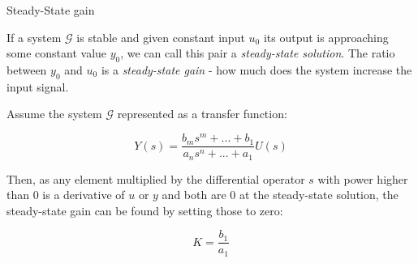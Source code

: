\documentclass{beamer}
\begin{document}
%		
%		
%		
%		
%		




\begin{frame}{Steady-State gain}
	\begin{flushleft}
		
		If a system  $\mathcal{G}$ is stable and given constant input $u_0$ its output is approaching some constant value $y_0$, we can call this pair a \emph{steady-state solution}. The ratio between $y_0$ and $u_0$ is a \emph{steady-state gain} - how much does the system increase the input signal.
		
		Assume the system  $\mathcal{G}$ represented as a transfer function:
		
		\begin{equation}
			Y(s) = \frac{b_m s^m + ... + b_1}{a_n s^n + ... + a_1} U(s)
		\end{equation}
		
		Then, as any element multiplied by the differential operator $s$ with power higher than 0 is a derivative of $u$ or $y$ and both are 0 at the steady-state solution, the steady-state gain can be found by setting those to zero:
		
		\begin{equation}
			K = \frac{b_1}{a_1}
		\end{equation}		
		
		
		
	\end{flushleft}
\end{frame}
\end{document}
